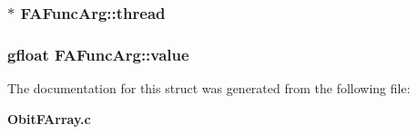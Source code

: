 \subsubsection{$\ast$ {\bf FAFunc\-Arg::thread}}\label{structFAFuncArg_o0}


\subsubsection{\setlength{\rightskip}{0pt plus 5cm}gfloat {\bf FAFunc\-Arg::value}}\label{structFAFuncArg_o9}




The documentation for this struct was generated from the following file:\begin{CompactItemize}
\item 
{\bf Obit\-FArray.c}\end{CompactItemize}

